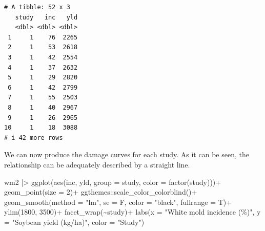 \documentclass[
  letterpaper,
  DIV=11,
  numbers=noendperiod]{scrreprt}
\newenvironment{Shaded}{\begin{snugshade}}{\end{snugshade}}
\newcommand{\AttributeTok}[1]{\textcolor[rgb]{0.40,0.45,0.13}{#1}}
\newcommand{\DecValTok}[1]{\textcolor[rgb]{0.68,0.00,0.00}{#1}}
\newcommand{\FunctionTok}[1]{\textcolor[rgb]{0.28,0.35,0.67}{#1}}
\newcommand{\NormalTok}[1]{\textcolor[rgb]{0.00,0.23,0.31}{#1}}
\newcommand{\SpecialCharTok}[1]{\textcolor[rgb]{0.37,0.37,0.37}{#1}}
\newcommand{\StringTok}[1]{\textcolor[rgb]{0.13,0.47,0.30}{#1}}
\begin{document}
\begin{verbatim}
# A tibble: 52 x 3
   study   inc   yld
   <dbl> <dbl> <dbl>
 1     1    76  2265
 2     1    53  2618
 3     1    42  2554
 4     1    37  2632
 5     1    29  2820
 6     1    42  2799
 7     1    55  2503
 8     1    40  2967
 9     1    26  2965
10     1    18  3088
# i 42 more rows
\end{verbatim}

We can now produce the damage curves for each study. As it can be seen,
the relationship can be adequately described by a straight line.

\begin{Shaded}
\begin{Highlighting}[]
\NormalTok{wm2 }\SpecialCharTok{|\textgreater{}} 
  \FunctionTok{ggplot}\NormalTok{(}\FunctionTok{aes}\NormalTok{(inc, yld, }
             \AttributeTok{group =}\NormalTok{ study, }
             \AttributeTok{color =} \FunctionTok{factor}\NormalTok{(study)))}\SpecialCharTok{+}
  \FunctionTok{geom\_point}\NormalTok{(}\AttributeTok{size =} \DecValTok{2}\NormalTok{)}\SpecialCharTok{+}
\NormalTok{  ggthemes}\SpecialCharTok{::}\FunctionTok{scale\_color\_colorblind}\NormalTok{()}\SpecialCharTok{+}
  \FunctionTok{geom\_smooth}\NormalTok{(}\AttributeTok{method =} \StringTok{"lm"}\NormalTok{, }\AttributeTok{se =}\NormalTok{ F, }\AttributeTok{color =} \StringTok{"black"}\NormalTok{, }\AttributeTok{fullrange =}\NormalTok{ T)}\SpecialCharTok{+}
  \FunctionTok{ylim}\NormalTok{(}\DecValTok{1800}\NormalTok{, }\DecValTok{3500}\NormalTok{)}\SpecialCharTok{+}
  \FunctionTok{facet\_wrap}\NormalTok{(}\SpecialCharTok{\textasciitilde{}}\NormalTok{study)}\SpecialCharTok{+}
  \FunctionTok{labs}\NormalTok{(}\AttributeTok{x =} \StringTok{"White mold incidence (\%)"}\NormalTok{,}
       \AttributeTok{y =} \StringTok{"Soybean yield (kg/ha)"}\NormalTok{,}
       \AttributeTok{color =} \StringTok{"Study"}\NormalTok{)}
\end{Highlighting}
\end{Shaded}
\end{document}
